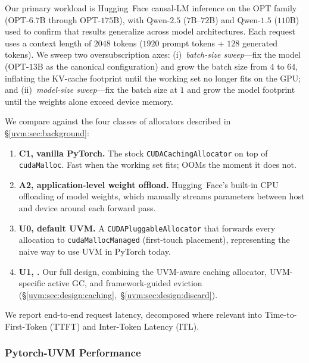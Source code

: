 Our primary workload is Hugging~Face causal-LM inference
    on the OPT family (OPT-$6.7$B through OPT-$175$B),
    with Qwen-$2.5$ ($7$B--$72$B) and Qwen-$1.5$ ($110$B)
    used to confirm that results generalize across model architectures.
Each request uses a context length of $2048$ tokens
    ($1920$ prompt tokens + $128$ generated tokens).
We sweep two oversubscription axes:
    (i)~\emph{batch-size sweep}---fix the model
    (OPT-$13$B as the canonical configuration)
    and grow the batch size from $4$ to $64$,
    inflating the KV-cache footprint until the working set
    no longer fits on the GPU; and
    (ii)~\emph{model-size sweep}---fix the batch size at $1$
    and grow the model footprint until the weights alone exceed device memory.

We compare {\uvmname} against the four classes of allocators
    described in \S\ref{uvm:sec:background}:
\begin{enumerate}
\item \textbf{C1, vanilla PyTorch.}
    The stock \texttt{CUDACachingAllocator} on top of \texttt{cudaMalloc}.
    Fast when the working set fits;
    OOMs the moment it does not.
\item \textbf{A2, application-level weight offload.}
    Hugging~Face's built-in CPU offloading of model weights,
    which manually streams parameters between host and device
    around each forward pass.
\item \textbf{U0, default UVM.}
    A \texttt{CUDAPluggableAllocator} that forwards every allocation
    to \texttt{cudaMallocManaged} (first-touch placement),
    representing the naive way to use UVM in PyTorch today.
\item \textbf{U1, {\uvmname}.}
    Our full design,
    combining the UVM-aware caching allocator,
    UVM-specific active GC,
    and framework-guided eviction
    (\S\ref{uvm:sec:design:caching},~\S\ref{uvm:sec:design:discard}).
\end{enumerate}

We report end-to-end request latency,
    decomposed where relevant into
    Time-to-First-Token (TTFT) and Inter-Token Latency (ITL).

\subsubsection{Pytorch-UVM Performance}
\label{uvm:sec:eval:oversub}

